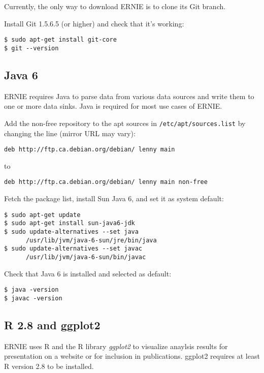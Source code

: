 \documentclass{article}
\begin{document}
Currently, the only way to download ERNIE is to clone its Git branch.

Install Git 1.5.6.5 (or higher) and check that it's working:

\begin{verbatim}
$ sudo apt-get install git-core
$ git --version
\end{verbatim}

\subsection{Java 6}

ERNIE requires Java to parse data from various data sources and write them
to one or more data sinks. Java is required for most use cases of ERNIE.

Add the non-free repository to the apt sources in
\verb+/etc/apt/sources.list+ by changing the line (mirror URL may vary):

\begin{verbatim}
deb http://ftp.ca.debian.org/debian/ lenny main
\end{verbatim}

to

\begin{verbatim}
deb http://ftp.ca.debian.org/debian/ lenny main non-free
\end{verbatim}

Fetch the package list, install Sun Java 6, and set it as system default:

\begin{verbatim}
$ sudo apt-get update
$ sudo apt-get install sun-java6-jdk
$ sudo update-alternatives --set java
      /usr/lib/jvm/java-6-sun/jre/bin/java
$ sudo update-alternatives --set javac
      /usr/lib/jvm/java-6-sun/bin/javac
\end{verbatim}

Check that Java 6 is installed and selected as default:

\begin{verbatim}
$ java -version
$ javac -version
\end{verbatim}

\subsection{R 2.8 and ggplot2}

ERNIE uses R and the R library \emph{ggplot2} to visualize anaylsis
results for presentation on a website or for inclusion in publications.
ggplot2 requires at least R version 2.8 to be installed.
\end{document}
